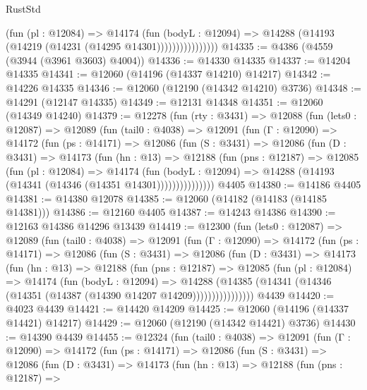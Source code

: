 \begin{lexlean}{RustStd}
\begin{coremodule}
                        (fun (pl : @12084) =>
                        @14174
                          (fun (bodyL : @12094) =>
                          @14288 (@14193 (@14219 (@14231 (@14295 @14301))))))))))))))))
@14335 := @4386 (@4559 (@3944 (@3961 @3603) @4004))
@14336 := @14330 @14335
@14337 := @14204 @14335
@14341 := @12060 (@14196 (@14337 @14210) @14217)
@14342 := @14226 @14335
@14346 := @12060 (@12190 (@14342 @14210) @3736)
@14348 := @14291 (@12147 @14335)
@14349 := @12131 @14348
@14351 := @12060 (@14349 @14240)
@14379 := @12278
    (fun (rty : @3431) =>
    @12088
      (fun (lets0 : @12087) =>
      @12089
        (fun (tail0 : @4038) =>
        @12091
          (fun (Γ : @12090) =>
          @14172
            (fun (ps : @14171) =>
            @12086
              (fun (S : @3431) =>
              @12086
                (fun (D : @3431) =>
                @14173
                  (fun (hn : @13) =>
                  @12188
                    (fun (pns : @12187) =>
                    @12085
                      (fun (pl : @12084) =>
                      @14174
                        (fun (bodyL : @12094) =>
                        @14288 (@14193 (@14341 (@14346 (@14351 @14301)))))))))))))))
    @4405
@14380 := @14186 @4405
@14381 := @14380 @12078
@14385 := @12060 (@14182 (@14183 (@14185 @14381)))
@14386 := @12160 @4405
@14387 := @14243 @14386
@14390 := @12163 @14386 @14296 @13439
@14419 := @12300
    (fun (lets0 : @12087) =>
    @12089
      (fun (tail0 : @4038) =>
      @12091
        (fun (Γ : @12090) =>
        @14172
          (fun (ps : @14171) =>
          @12086
            (fun (S : @3431) =>
            @12086
              (fun (D : @3431) =>
              @14173
                (fun (hn : @13) =>
                @12188
                  (fun (pns : @12187) =>
                  @12085
                    (fun (pl : @12084) =>
                    @14174
                      (fun (bodyL : @12094) =>
                      @14288
                        (@14385
                          (@14341 (@14346 (@14351 (@14387 (@14390 @14207 @14209))))))))))))))))
    @4439
@14420 := @4023 @4439
@14421 := @14420 @14209
@14425 := @12060 (@14196 (@14337 @14421) @14217)
@14429 := @12060 (@12190 (@14342 @14421) @3736)
@14430 := @14390 @4439
@14455 := @12324
    (fun (tail0 : @4038) =>
    @12091
      (fun (Γ : @12090) =>
      @14172
        (fun (ps : @14171) =>
        @12086
          (fun (S : @3431) =>
          @12086
            (fun (D : @3431) =>
            @14173
              (fun (hn : @13) =>
              @12188
                (fun (pns : @12187) =>

\end{coremodule}
\end{lexlean}
